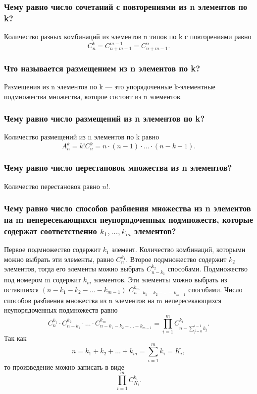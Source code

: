\subsubsection*{Чему равно число сочетаний с повторениями из n элементов по k?}

Количество разных комбинаций из элементов n типов по k с повторениями равно
$$C_n^k=C_{n+m-1}^{m-1}=C_{n+m-1}^n.$$

\subsubsection*{Что называется размещением из n элементов по k?}

Размещения из n элементов по k --- это упорядоченные k-элементные подмножества множества, которое состоит из n элементов.

\subsubsection*{Чему равно число размещений из n элементов по k?}

Количество размещений из n элементов по k равно
$$A_n^k=k!C_n^k=n\cdot(n-1)\cdot \dotsc \cdot(n-k+1).$$

\subsubsection*{Чему равно число перестановок множества из n элементов?}

Количество перестановок равно $n!$.

\subsubsection*{Чему равно число способов разбиения множества из n элементов на m непересекающихся неупорядоченных подмножеств, которые содержат соответственно $k_1,  \dotsc , k_m$ элементов?}

Первое подмножество содержит $k_1$ элемент.
Количество комбинаций, которыми можно выбрать эти элементы, равно $C_n^{k_1}$.
Второе подмножество содержит $k_2$ элементов, тогда его элементы можно выбрать $C_{n-k_1}^{k_2}$ способами.
Подмножество под номером m содержит $k_m$ элементов.
Эти элементы можно выбрать из оставшихся
$ \left( n - k_1 - k_2 - \dotsc - k_{m-1} \right) $
$C_{n-k_1-k_2- \dotsc - k_{m-1} }^{k_m} $ способами.
Число способов разбиения множества из n элементов на m непересекающихся неупорядоченных подмножеств равно
$$ C_n^{k_1} \cdot C_{n-k_1}^{k_2} \cdot \dotsc \cdot C_{n-k_1-k_2 - \dotsc - k_{m - 1} }^{k_m} = \prod \limits_{i=1}^m C_{n-\sum \limits_{j=0}^{i-1} k_j}^{k_i}.$$
Так как $$ n = k_1 + k_2 + \dotsc + k_m = \sum \limits_{i=1}^m k_i = K_i,$$
то произведение можно записать в виде
$$ \prod \limits_{i=1}^m C_{K_i}^{k_i}.$$

